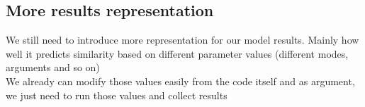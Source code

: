 \documentclass[12pt]{article}
\begin{document}
\subsection{More results representation}
We still need to introduce more representation for our model results. Mainly how well it predicts similarity based on different parameter values (different modes, arguments and so on) \\ 
We already can modify those values easily from the code itself and as argument, we just need to run those values and collect results
\end{document}
